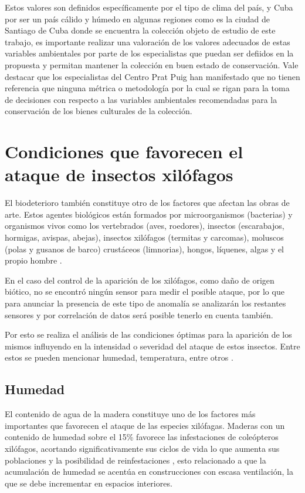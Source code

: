     Estos valores son definidos específicamente por el tipo de clima del país, y Cuba por ser un país cálido y húmedo en algunas regiones como es la ciudad de Santiago de Cuba donde se encuentra la colección objeto de estudio de este trabajo, 
    es importante realizar una valoración de los valores adecuados de estas variables ambientales por parte de los especialistas que puedan ser defiidos en la propuesta y permitan mantener la colección en buen estado de conservación.
    Vale destacar que los especialistas del Centro Prat Puig han manifestado que no tienen referencia que ninguna métrica o metodología por la cual se rigan para la toma de decisiones con respecto a las variables ambientales recomendadas para la conservación de los bienes culturales de la colección.
    
    \newpage

    \section{Condiciones que favorecen el ataque de insectos xilófagos}

    El biodeterioro también constituye otro de los factores que afectan las obras de arte. Estos agentes biológicos están formados por microorganismos (bacterias) y organismos vivos como los vertebrados (aves, roedores), insectos (escarabajos, hormigas, avispas, abejas), insectos xilófagos (termitas y carcomas), moluscos (polas y gusanos de barco) crustáceos (limnorias), hongos, líquenes, algas y el propio hombre \cite{marquezAgentesDeterioroMedioambientales2016}.
    
    En el caso del control de la aparición de los xilófagos, como daño de origen biótico, no se encontró ningún sensor para medir el posible ataque, por lo que para anunciar la presencia de este tipo de anomalía se analizarán los restantes sensores y por correlación de datos será posible tenerlo en cuenta también.
    
    Por esto se realiza el análisis de las condiciones óptimas para la aparición de los mismos influyendo en la intensidad o severidad del ataque de estos insectos. Entre estos se pueden mencionar humedad, temperatura, entre otros \cite{ripa2004termitas}. 
    
    \subsection{Humedad}

    El contenido de agua de la madera constituye uno de los factores más importantes que favorecen el ataque de las especies xilófagas. Maderas con un contenido de humedad sobre el 15\% favorece las infestaciones de coleópteros xilófagos, acortando significativamente sus ciclos de vida lo que aumenta sus poblaciones y la posibilidad de reinfestaciones \cite{ripa2004termitas}, esto relacionado a que la acumulación de humedad se acentúa en construcciones con escasa ventilación, la que se debe incrementar en espacios interiores.

